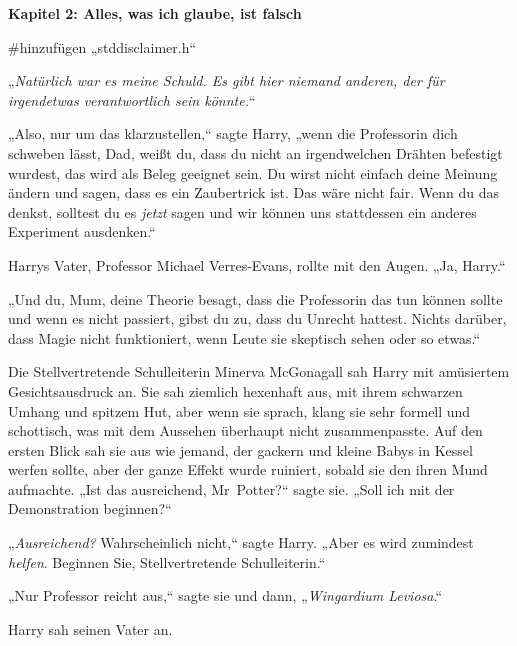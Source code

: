

\hypertarget{alles-was-ich-glaube-ist-falsch}{%

\textbf{Kapitel 2: Alles, was ich glaube, ist falsch}

\#hinzufügen „stddisclaimer.h“

\later

„\emph{Natürlich war es meine Schuld. Es gibt hier niemand anderen, der für irgendetwas verantwortlich sein könnte.}“

\later

„Also, nur um das klarzustellen,“ sagte Harry, „wenn die Professorin dich schweben lässt, Dad, weißt du, dass du nicht an irgendwelchen Drähten befestigt wurdest, das wird als Beleg geeignet sein. Du wirst nicht einfach deine Meinung ändern und sagen, dass es ein Zaubertrick ist. Das wäre nicht fair. Wenn du das denkst, solltest du es \emph{jetzt} sagen und wir können uns stattdessen ein anderes Experiment ausdenken.“

Harrys Vater, Professor Michael Verres-Evans, rollte mit den Augen. „Ja, Harry.“

„Und du, Mum, deine Theorie besagt, dass die Professorin das tun können sollte und wenn es nicht passiert, gibst du zu, dass du Unrecht hattest. Nichts darüber, dass Magie nicht funktioniert, wenn Leute sie skeptisch sehen oder so etwas.“

Die Stellvertretende Schulleiterin Minerva McGonagall sah Harry mit amüsiertem Gesichtsausdruck an. Sie sah ziemlich hexenhaft aus, mit ihrem schwarzen Umhang und spitzem Hut, aber wenn sie sprach, klang sie sehr formell und schottisch, was mit dem Aussehen überhaupt nicht zusammenpasste. Auf den ersten Blick sah sie aus wie jemand, der gackern und kleine Babys in Kessel werfen sollte, aber der ganze Effekt wurde ruiniert, sobald sie den ihren Mund aufmachte. „Ist das ausreichend, Mr~Potter?“ sagte sie. „Soll ich mit der Demonstration beginnen?“

„\emph{Ausreichend?} Wahrscheinlich nicht,“ sagte Harry. „Aber es wird zumindest \emph{helfen}. Beginnen Sie, Stellvertretende Schulleiterin.“

„Nur Professor reicht aus,“ sagte sie und dann, „\emph{Wingardium Leviosa}.“

Harry sah seinen Vater an.

}
